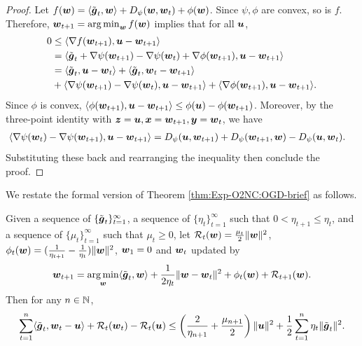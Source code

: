 \begin{proof}
Let $f({\boldsymbol{w}}) = \langle \tilde{{\boldsymbol{g}}}_t,{\boldsymbol{w}}\rangle + D_\psi({\boldsymbol{w}},{\boldsymbol{w}}_t) + \phi({\boldsymbol{w}})$. Since $\psi, \phi$ are convex, so is $f$. Therefore, ${\boldsymbol{w}}_{t+1} = \mathop{\operatorname{arg\,min}}_{\boldsymbol{w}} f({\boldsymbol{w}})$ implies that for all ${\boldsymbol{u}}$,
\begin{align*}
    0 
    &\le \langle \nabla f({\boldsymbol{w}}_{t+1}), {\boldsymbol{u}}-{\boldsymbol{w}}_{t+1}\rangle \\
    &= \langle \tilde{{\boldsymbol{g}}}_t + \nabla\psi({\boldsymbol{w}}_{t+1}) - \nabla\psi({\boldsymbol{w}}_t) + \nabla\phi({\boldsymbol{w}}_{t+1}), {\boldsymbol{u}}-{\boldsymbol{w}}_{t+1}\rangle \\
    &= \langle\tilde{{\boldsymbol{g}}}_t, {\boldsymbol{u}}-{\boldsymbol{w}}_t\rangle + \langle\tilde{{\boldsymbol{g}}}_t,{\boldsymbol{w}}_t-{\boldsymbol{w}}_{t+1}\rangle \\
    &+ \langle \nabla\psi({\boldsymbol{w}}_{t+1})-\nabla\psi({\boldsymbol{w}}_t),{\boldsymbol{u}}-{\boldsymbol{w}}_{t+1}\rangle + \langle\nabla \phi({\boldsymbol{w}}_{t+1}),{\boldsymbol{u}}-{\boldsymbol{w}}_{t+1}\rangle.
\end{align*}
Since $\phi$ is convex, $\langle \phi({\boldsymbol{w}}_{t+1}),{\boldsymbol{u}}-{\boldsymbol{w}}_{t+1}\rangle \le \phi({\boldsymbol{u}})-\phi({\boldsymbol{w}}_{t+1})$. Moreover, by the three-point identity with ${\boldsymbol{z}}={\boldsymbol{u}}, {\boldsymbol{x}}={\boldsymbol{w}}_{t+1}, {\boldsymbol{y}}={\boldsymbol{w}}_t$, we have
\begin{align*}
    \langle \nabla\psi({\boldsymbol{w}}_t) - \nabla\psi({\boldsymbol{w}}_{t+1}),{\boldsymbol{u}}-{\boldsymbol{w}}_{t+1}\rangle 
    &= D_\psi({\boldsymbol{u}},{\boldsymbol{w}}_{t+1}) + D_\psi({\boldsymbol{w}}_{t+1},{\boldsymbol{w}}) - D_\psi({\boldsymbol{u}},{\boldsymbol{w}}_t).
\end{align*}
Substituting these back and rearranging the inequality then conclude the proof.
\end{proof}

We restate the formal version of Theorem \ref{thm:Exp-O2NC:OGD-brief} as follows.

\begin{theorem}
\label{thm:Exp-O2NC:OGD-formal}
Given a sequence of $\{\tilde{{\boldsymbol{g}}}_t\}_{t=1}^\infty$, a sequence of $\{\eta_t\}_{t=1}^\infty$ such that $0<\eta_{t+1} \le \eta_t$, and a sequence of $\{\mu_t\}_{t=1}^\infty$ such that $\mu_t\ge 0$, let ${\cal R}_t({\boldsymbol{w}})=\frac{\mu_t}{2}\|{\boldsymbol{w}}\|^2$, $\phi_t({\boldsymbol{w}})=(\frac{1}{\eta_{t+1}}-\frac{1}{\eta_t})\|{\boldsymbol{w}}\|^2$, ${\boldsymbol{w}}_1=0$ and ${\boldsymbol{w}}_t$ updated by
\begin{equation*}
    {\boldsymbol{w}}_{t+1} = \mathop{\operatorname{arg\,min}}_{\boldsymbol{w}} \langle \tilde{{\boldsymbol{g}}}_t,{\boldsymbol{w}}\rangle + \frac{1}{2\eta_t}\|{\boldsymbol{w}}-{\boldsymbol{w}}_t\|^2 + \phi_t({\boldsymbol{w}}) + {\cal R}_{t+1}({\boldsymbol{w}}).
\end{equation*}
Then for any $n\in \mathbb N$,
\begin{equation*}
    \sum_{t=1}^n \langle \tilde{{\boldsymbol{g}}}_t, {\boldsymbol{w}}_t-{\boldsymbol{u}}\rangle + {\cal R}_t({\boldsymbol{w}}_t) - {\cal R}_t({\boldsymbol{u}}) 
    \le \left(\frac{2}{\eta_{n+1}} + \frac{\mu_{n+1}}{2}\right)\|{\boldsymbol{u}}\|^2 + \frac{1}{2}\sum_{t=1}^n \eta_t\|\tilde{{\boldsymbol{g}}}_t\|^2.
\end{equation*}
\end{theorem}

